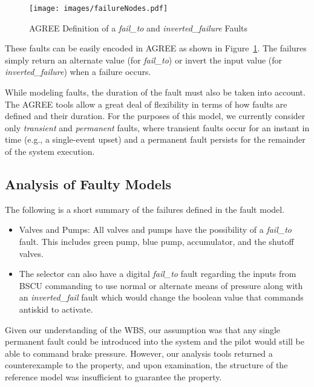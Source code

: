 \begin{figure}[h!]
  \centering
 \texttt{[image: images/failureNodes.pdf]}
  \vspace{-0.1in}
  \caption{AGREE Definition of a \textit{fail\_to} and \textit{inverted\_failure} Faults}
  \label{fig:failureNodes}
\end{figure}

These faults can be easily encoded in AGREE as shown in Figure~\ref{fig:failureNodes}.  The failures simply return an alternate value (for {\em fail\_to}) or invert the input value (for {\em inverted\_failure}) when a failure occurs.


While modeling faults, the duration of the fault must also be taken into account.  The AGREE tools allow a great deal of flexibility in terms of how faults are defined and their duration.  For the purposes of this model, we currently consider only {\em transient} and {\em permanent} faults, where transient faults occur for an instant in time (e.g., a single-event upset) and a permanent fault persists for the remainder of the system execution.


\subsection{Analysis of Faulty Models}
The following is a short summary of the failures defined in the fault model.

\begin{itemize}

\item Valves and Pumps: All valves and pumps have the possibility of a \textit{fail\_to} fault. This includes green pump, blue pump, accumulator, and the shutoff valves.

\item  The selector can also have a digital \textit{fail\_to} fault regarding the inputs from BSCU commanding to use normal or alternate means of pressure along with an \textit{inverted\_fail} fault which would change the boolean value that commands antiskid to activate.

\end{itemize}

Given our understanding of the WBS, our assumption was that any single permanent fault could be introduced into the system and the pilot would still be able to command brake pressure.  However, our analysis tools returned a counterexample to the property, and upon examination, the structure of the reference model was insufficient to guarantee the property.

